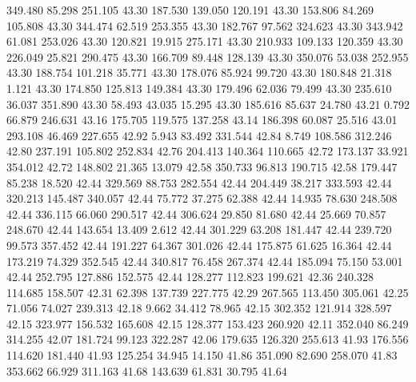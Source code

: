  349.480   85.298  251.105        43.30
 187.530  139.050  120.191        43.30
 153.806   84.269  105.808        43.30
 344.474   62.519  253.355        43.30
 182.767   97.562  324.623        43.30
 343.942   61.081  253.026        43.30
 120.821   19.915  275.171        43.30
 210.933  109.133  120.359        43.30
 226.049   25.821  290.475        43.30
 166.709   89.448  128.139        43.30
 350.076   53.038  252.955        43.30
 188.754  101.218   35.771        43.30
 178.076   85.924   99.720        43.30
 180.848   21.318    1.121        43.30
 174.850  125.813  149.384        43.30
 179.496   62.036   79.499        43.30
 235.610   36.037  351.890        43.30
  58.493   43.035   15.295        43.30
 185.616   85.637   24.780        43.21
   0.792   66.879  246.631        43.16
 175.705  119.575  137.258        43.14
 186.398   60.087   25.516        43.01
 293.108   46.469  227.655        42.92
   5.943   83.492  331.544        42.84
   8.749  108.586  312.246        42.80
 237.191  105.802  252.834        42.76
 204.413  140.364  110.665        42.72
 173.137   33.921  354.012        42.72
 148.802   21.365   13.079        42.58
 350.733   96.813  190.715        42.58
 179.447   85.238   18.520        42.44
 329.569   88.753  282.554        42.44
 204.449   38.217  333.593        42.44
 320.213  145.487  340.057        42.44
  75.772   37.275   62.388        42.44
  14.935   78.630  248.508        42.44
 336.115   66.060  290.517        42.44
 306.624   29.850   81.680        42.44
  25.669   70.857  248.670        42.44
 143.654   13.409    2.612        42.44
 301.229   63.208  181.447        42.44
 239.720   99.573  357.452        42.44
 191.227   64.367  301.026        42.44
 175.875   61.625   16.364        42.44
 173.219   74.329  352.545        42.44
 340.817   76.458  267.374        42.44
 185.094   75.150   53.001        42.44
 252.795  127.886  152.575        42.44
 128.277  112.823  199.621        42.36
 240.328  114.685  158.507        42.31
  62.398  137.739  227.775        42.29
 267.565  113.450  305.061        42.25
  71.056   74.027  239.313        42.18
   9.662   34.412   78.965        42.15
 302.352  121.914  328.597        42.15
 323.977  156.532  165.608        42.15
 128.377  153.423  260.920        42.11
 352.040   86.249  314.255        42.07
 181.724   99.123  322.287        42.06
 179.635  126.320  255.613        41.93
 176.556  114.620  181.440        41.93
 125.254   34.945   14.150        41.86
 351.090   82.690  258.070        41.83
 353.662   66.929  311.163        41.68
 143.639   61.831   30.795        41.64
